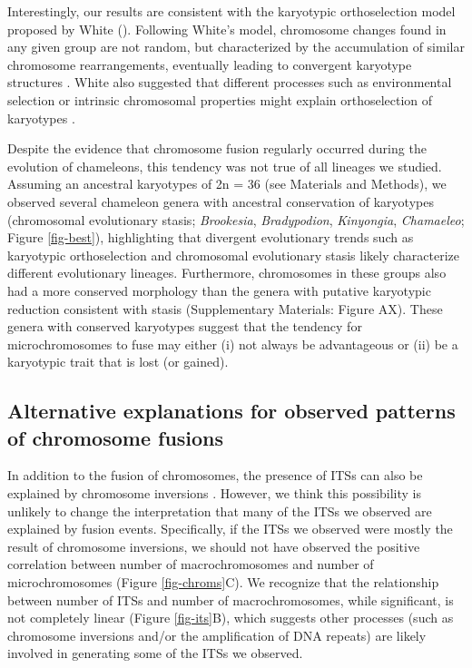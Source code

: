 \documentclass[a4paper, 12pt]{article}
\begin{document}
Interestingly, our results are consistent with the karyotypic orthoselection model proposed by White (\citeyear{white1973,white1975chromosome}). 
Following White's model, chromosome changes found in any given group are not random, but characterized by the accumulation of similar chromosome rearrangements, eventually leading to convergent karyotype structures \citep{white1973,white1975chromosome}. 
White also suggested that different processes such as environmental selection or intrinsic chromosomal properties might explain orthoselection of karyotypes \citep{white1973,white1975chromosome}.

Despite the evidence that chromosome fusion regularly occurred during the evolution of chameleons, this tendency was not true of all lineages we studied. Assuming an ancestral karyotypes of 2n = 36 \citep{rovatsos2017evolution} (see Materials and Methods), we observed several chameleon genera with ancestral conservation of karyotypes (chromosomal evolutionary stasis; \textit{Brookesia}, \textit{Bradypodion}, \textit{Kinyongia}, \textit{Chamaeleo}; Figure \ref{fig-best}), highlighting that divergent evolutionary trends such as karyotypic orthoselection and chromosomal evolutionary stasis likely characterize different evolutionary lineages. 
Furthermore, chromosomes in these groups also had a more conserved morphology than the genera with putative karyotypic reduction consistent with stasis (Supplementary Materials: Figure AX). 
These genera with conserved karyotypes suggest that the tendency for microchromosomes to fuse may either (i) not always be advantageous or (ii) be a karyotypic trait that is lost (or gained). 

\subsection{Alternative explanations for observed patterns of chromosome fusions}
In addition to the fusion of chromosomes, the presence of ITSs can also be explained by chromosome inversions \citep{bolzan2017interstitial}. 
However, we think this possibility is unlikely to change the interpretation that many of the ITSs we observed are explained by fusion events. 
Specifically, if the ITSs we observed were mostly the result of chromosome inversions, we should not have observed the positive correlation between number of macrochromosomes and number of microchromosomes (Figure \ref{fig-chroms}C). 
We recognize that the relationship between number of ITSs and number of macrochromosomes, while significant, is not completely linear (Figure \ref{fig-its}B), which suggests other processes (such as chromosome inversions and/or the amplification of DNA repeats) are likely involved in generating some of the ITSs we observed.
\end{document}
